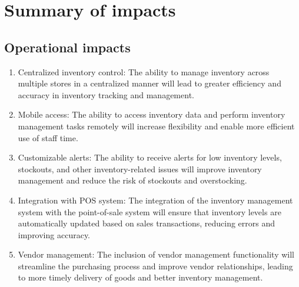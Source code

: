 \chapter{Summary of impacts \\ 
\label{Chapter::Summaryofimpacts}} 
\section{Operational impacts \label{Section::Operationalimpacts}}
\begin{enumerate}
    \item Centralized inventory control: The ability to manage inventory across multiple stores in a centralized manner will lead to greater efficiency and accuracy in inventory tracking and management.

    \item Mobile access: The ability to access inventory data and perform inventory management tasks remotely will increase flexibility and enable more efficient use of staff time.

    \item Customizable alerts: The ability to receive alerts for low inventory levels, stockouts, and other inventory-related issues will improve inventory management and reduce the risk of stockouts and overstocking.

    \item Integration with POS system: The integration of the inventory management system with the point-of-sale system will ensure that inventory levels are automatically updated based on sales transactions, reducing errors and improving accuracy.

    \item Vendor management: The inclusion of vendor management functionality will streamline the purchasing process and improve vendor relationships, leading to more timely delivery of goods and better inventory management.
\end{enumerate}
